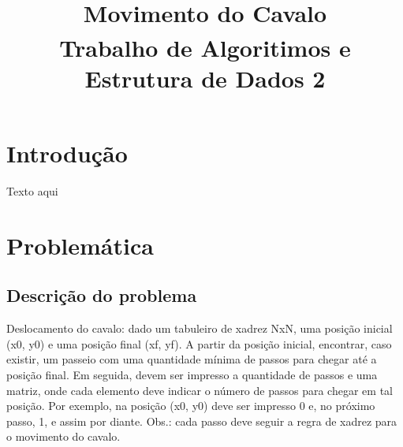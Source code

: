 \documentclass[relatorio]{IEEEtran}
\begin{document}
\title{Movimento do Cavalo\\
{\footnotesize \textsuperscript{}Trabalho de Algoritimos e Estrutura de Dados 2}
}

\author{
\and
{}
\and
{}
\and
{}
\and
{}
}

\maketitle

\section{Introdução}
Texto aqui

\section{Problemática}

\subsection{Descrição do problema}
Deslocamento do cavalo: dado um tabuleiro de xadrez NxN, uma posição inicial (x0, y0) e uma posição final (xf, yf). A partir da posição
inicial, encontrar, caso existir, um passeio com uma quantidade mínima de passos para chegar até a posição final. Em seguida, devem
ser impresso a quantidade de passos e uma matriz, onde cada elemento deve indicar o número de passos para chegar em tal posição.
Por exemplo, na posição (x0, y0) deve ser impresso 0 e, no próximo passo, 1, e assim por diante. Obs.: cada passo deve seguir a regra
de xadrez para o movimento do cavalo.
\end{document}
